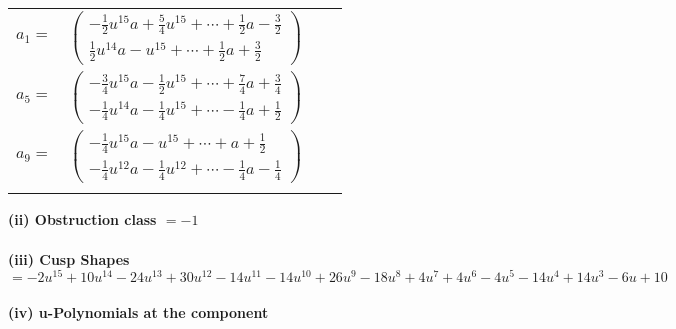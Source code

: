 \documentclass[1p]{elsarticle_modified}
\theoremstyle{definition}
\begin{document}
\begin{tabular}{m{7pt} m{180pt} m{7pt} m{180pt} }
\flushright $a_{1}=$&$\begin{pmatrix}-\frac{1}{2} u^{15} a+\frac{5}{4} u^{15}+\cdots+\frac{1}{2} a-\frac{3}{2}\\\frac{1}{2} u^{14} a- u^{15}+\cdots+\frac{1}{2} a+\frac{3}{2}\end{pmatrix}$ \\
\flushright $a_{5}=$&$\begin{pmatrix}-\frac{3}{4} u^{15} a-\frac{1}{2} u^{15}+\cdots+\frac{7}{4} a+\frac{3}{4}\\-\frac{1}{4} u^{14} a-\frac{1}{4} u^{15}+\cdots-\frac{1}{4} a+\frac{1}{2}\end{pmatrix}$ \\
\flushright $a_{9}=$&$\begin{pmatrix}-\frac{1}{4} u^{15} a- u^{15}+\cdots+a+\frac{1}{2}\\-\frac{1}{4} u^{12} a-\frac{1}{4} u^{12}+\cdots-\frac{1}{4} a-\frac{1}{4}\end{pmatrix}$\\&\end{tabular}
\flushleft \textbf{(ii) Obstruction class $= -1$}\\~\\
\flushleft \textbf{(iii) Cusp Shapes $= -2 u^{15}+10 u^{14}-24 u^{13}+30 u^{12}-14 u^{11}-14 u^{10}+26 u^9-18 u^8+4 u^7+4 u^6-4 u^5-14 u^4+14 u^3-6 u+10$}\\~\\
\newpage\renewcommand{\arraystretch}{1}
\flushleft \textbf{(iv) u-Polynomials at the component}\newline \\
\end{document}
